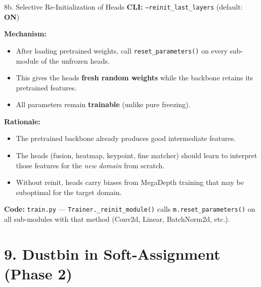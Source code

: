 \documentclass[aspectratio=169, 12pt]{beamer}
\begin{document}
\begin{frame}{8b. Selective Re-Initialization of Heads}
\small
\textbf{CLI:} \texttt{--reinit\_last\_layers} (default: \textbf{ON})

\medskip
\textbf{Mechanism:}
\begin{itemize}\setlength{\itemsep}{2pt}
    \item After loading pretrained weights, call \texttt{reset\_parameters()} on
          every sub-module of the unfrozen heads.
    \item This gives the heads \textbf{fresh random weights} while the backbone
          retains its pretrained features.
    \item All parameters remain \textbf{trainable} (unlike pure freezing).
\end{itemize}

\medskip
\textbf{Rationale:}
\begin{itemize}\setlength{\itemsep}{1pt}
    \item The pretrained backbone already produces good intermediate features.
    \item The heads (fusion, heatmap, keypoint, fine matcher) should learn to
          interpret those features for the \emph{new domain} from scratch.
    \item Without reinit, heads carry biases from MegaDepth training that may
          be suboptimal for the target domain.
\end{itemize}

\medskip
\textbf{Code:} \texttt{train.py} --- \texttt{Trainer.\_reinit\_module()} calls
\texttt{m.reset\_parameters()} on all sub-modules with that method (Conv2d, Linear,
BatchNorm2d, etc.).
\end{frame}


\section{9. Dustbin in Soft-Assignment (Phase 2)}
\end{document}
